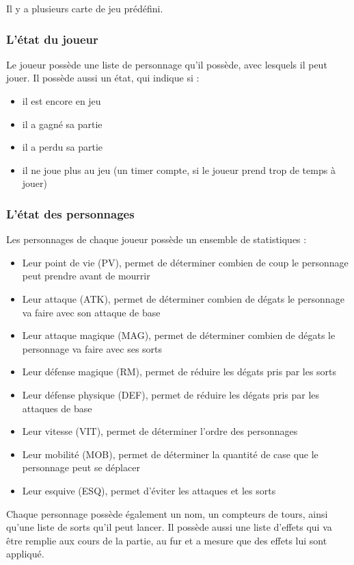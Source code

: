 \documentclass[a4paper,12pt]{article}
\begin{document}
Il y a plusieurs carte de jeu prédéfini.

\subsubsection{L'état du joueur}

Le joueur possède une liste de personnage qu'il possède, avec lesquels il peut jouer.
Il possède aussi un état, qui indique si :
\begin{itemize}
  \item il est encore en jeu
  \item il a gagné sa partie
  \item il a perdu sa partie
  \item il ne joue plus au jeu  (un timer compte, si le joueur prend trop de temps à jouer)
\end{itemize}

\subsubsection{L'état des personnages}

Les personnages de chaque joueur possède un ensemble de statistiques :
\begin{itemize}
  \item Leur point de vie (PV), permet de déterminer combien de coup le personnage peut prendre avant de mourrir
  \item Leur attaque (ATK), permet de déterminer combien de dégats le personnage va faire avec son attaque de base
  \item Leur attaque magique (MAG), permet de déterminer combien de dégats le personnage va faire avec ses sorts
  \item Leur défense magique (RM), permet de réduire les dégats pris par les sorts
  \item Leur défense physique (DEF), permet de réduire les dégats pris par les attaques de base
  \item Leur vitesse (VIT), permet de déterminer l'ordre des personnages
  \item Leur mobilité (MOB), permet de déterminer la quantité de case que le personnage peut se déplacer
  \item Leur esquive (ESQ), permet d'éviter les attaques et les sorts
\end{itemize}

Chaque personnage possède également un nom, un compteurs de tours, ainsi qu'une liste
de sorts qu'il peut lancer. Il possède aussi une liste d'effets qui va être remplie aux cours de la partie,
au fur et a mesure que des effets lui sont appliqué.
\end{document}
